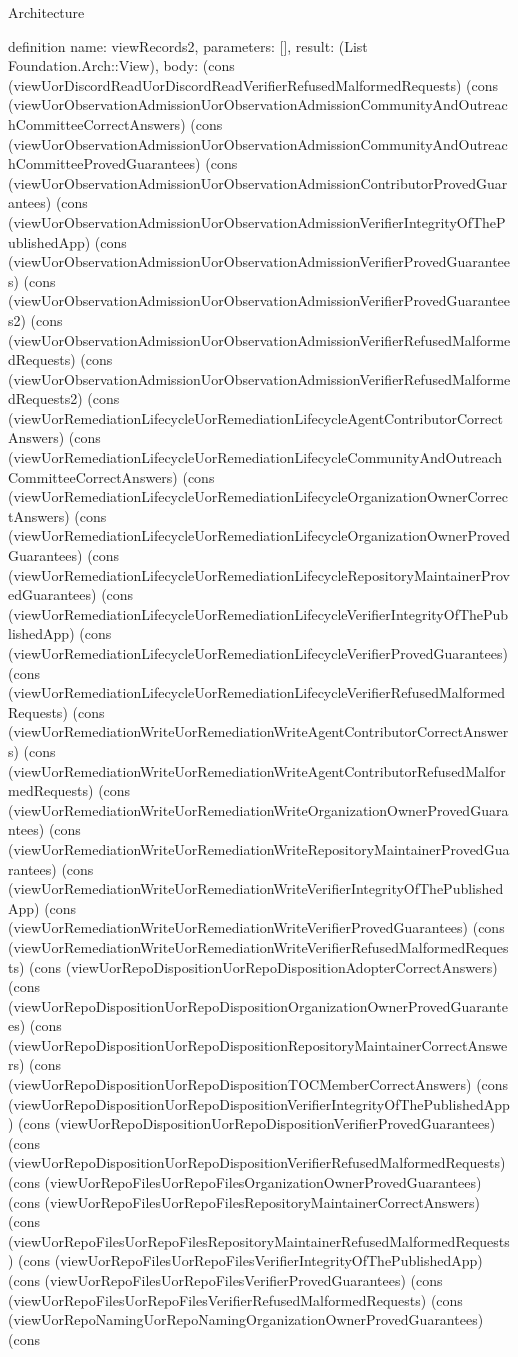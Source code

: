 \begin{lexlean}{Architecture}
\begin{semanticmodule}
definition{
  name: viewRecords2,
  parameters: [],
  result: (List Foundation.Arch::View),
  body: (cons (viewUorDiscordReadUorDiscordReadVerifierRefusedMalformedRequests) (cons (viewUorObservationAdmissionUorObservationAdmissionCommunityAndOutreachCommitteeCorrectAnswers) (cons (viewUorObservationAdmissionUorObservationAdmissionCommunityAndOutreachCommitteeProvedGuarantees) (cons (viewUorObservationAdmissionUorObservationAdmissionContributorProvedGuarantees) (cons (viewUorObservationAdmissionUorObservationAdmissionVerifierIntegrityOfThePublishedApp) (cons (viewUorObservationAdmissionUorObservationAdmissionVerifierProvedGuarantees) (cons (viewUorObservationAdmissionUorObservationAdmissionVerifierProvedGuarantees2) (cons (viewUorObservationAdmissionUorObservationAdmissionVerifierRefusedMalformedRequests) (cons (viewUorObservationAdmissionUorObservationAdmissionVerifierRefusedMalformedRequests2) (cons (viewUorRemediationLifecycleUorRemediationLifecycleAgentContributorCorrectAnswers) (cons (viewUorRemediationLifecycleUorRemediationLifecycleCommunityAndOutreachCommitteeCorrectAnswers) (cons (viewUorRemediationLifecycleUorRemediationLifecycleOrganizationOwnerCorrectAnswers) (cons (viewUorRemediationLifecycleUorRemediationLifecycleOrganizationOwnerProvedGuarantees) (cons (viewUorRemediationLifecycleUorRemediationLifecycleRepositoryMaintainerProvedGuarantees) (cons (viewUorRemediationLifecycleUorRemediationLifecycleVerifierIntegrityOfThePublishedApp) (cons (viewUorRemediationLifecycleUorRemediationLifecycleVerifierProvedGuarantees) (cons (viewUorRemediationLifecycleUorRemediationLifecycleVerifierRefusedMalformedRequests) (cons (viewUorRemediationWriteUorRemediationWriteAgentContributorCorrectAnswers) (cons (viewUorRemediationWriteUorRemediationWriteAgentContributorRefusedMalformedRequests) (cons (viewUorRemediationWriteUorRemediationWriteOrganizationOwnerProvedGuarantees) (cons (viewUorRemediationWriteUorRemediationWriteRepositoryMaintainerProvedGuarantees) (cons (viewUorRemediationWriteUorRemediationWriteVerifierIntegrityOfThePublishedApp) (cons (viewUorRemediationWriteUorRemediationWriteVerifierProvedGuarantees) (cons (viewUorRemediationWriteUorRemediationWriteVerifierRefusedMalformedRequests) (cons (viewUorRepoDispositionUorRepoDispositionAdopterCorrectAnswers) (cons (viewUorRepoDispositionUorRepoDispositionOrganizationOwnerProvedGuarantees) (cons (viewUorRepoDispositionUorRepoDispositionRepositoryMaintainerCorrectAnswers) (cons (viewUorRepoDispositionUorRepoDispositionTOCMemberCorrectAnswers) (cons (viewUorRepoDispositionUorRepoDispositionVerifierIntegrityOfThePublishedApp) (cons (viewUorRepoDispositionUorRepoDispositionVerifierProvedGuarantees) (cons (viewUorRepoDispositionUorRepoDispositionVerifierRefusedMalformedRequests) (cons (viewUorRepoFilesUorRepoFilesOrganizationOwnerProvedGuarantees) (cons (viewUorRepoFilesUorRepoFilesRepositoryMaintainerCorrectAnswers) (cons (viewUorRepoFilesUorRepoFilesRepositoryMaintainerRefusedMalformedRequests) (cons (viewUorRepoFilesUorRepoFilesVerifierIntegrityOfThePublishedApp) (cons (viewUorRepoFilesUorRepoFilesVerifierProvedGuarantees) (cons (viewUorRepoFilesUorRepoFilesVerifierRefusedMalformedRequests) (cons (viewUorRepoNamingUorRepoNamingOrganizationOwnerProvedGuarantees) (cons }
\end{semanticmodule}
\end{lexlean}
